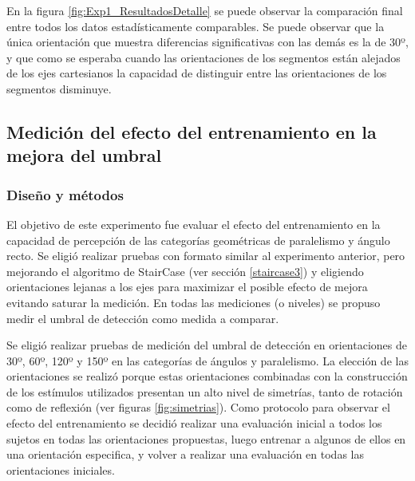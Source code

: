 \documentclass{article}
\begin{document}
    En la figura \ref{fig:Exp1_ResultadosDetalle} se puede observar la comparación final entre todos los datos estadísticamente comparables. Se puede observar que la única orientación que muestra diferencias significativas con las demás es la de 30º, y que como se esperaba cuando las orientaciones de los segmentos están alejados de los ejes cartesianos la capacidad de distinguir entre las orientaciones de los segmentos disminuye. 
    
    
    \subsection{Medición del efecto del entrenamiento en la mejora del umbral}
    
    \subsubsection{Diseño y métodos} \label{seccion:Exp2_Diseno}
    
    El objetivo de este experimento fue evaluar el efecto del entrenamiento en la capacidad de percepción de las categorías geométricas de paralelismo y ángulo recto. Se eligió realizar pruebas con formato similar al experimento anterior, pero mejorando el algoritmo de StairCase (ver sección \ref{staircase3}) y eligiendo orientaciones lejanas a los ejes para maximizar el posible efecto de mejora evitando saturar la medición. En todas las mediciones (o niveles) se propuso medir el umbral de detección como medida a comparar.
    
    Se eligió realizar pruebas de medición del umbral de detección en orientaciones de 30º, 60º, 120º y 150º en las categorías de ángulos y paralelismo. La elección de las orientaciones se realizó porque estas orientaciones combinadas con la construcción de los estímulos utilizados presentan un alto nivel de simetrías, tanto de rotación como de reflexión (ver figuras \ref{fig:simetrias}). Como protocolo para observar el efecto del entrenamiento se decidió realizar una evaluación inicial a todos los sujetos en todas las orientaciones propuestas, luego entrenar a algunos de ellos en una orientación especifica, y volver a realizar una evaluación en todas las orientaciones iniciales. 
    
\end{document}
